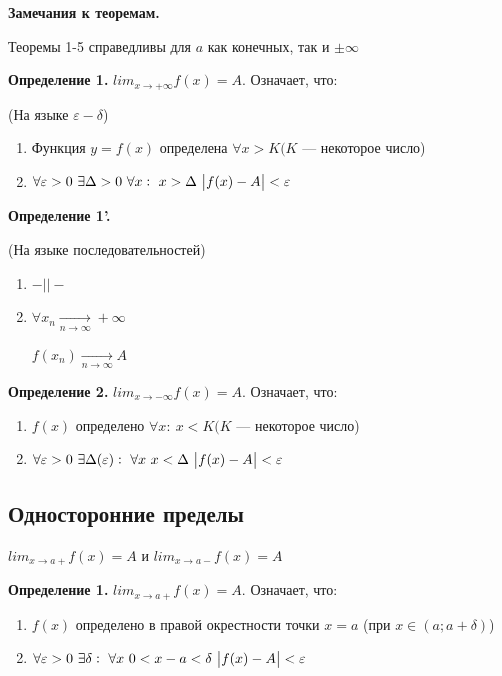 \documentclass{article}
\begin{document}
  \textbf{Замечания к теоремам.}
  
  Теоремы 1-5 справедливы для \(a\) как конечных, так и \(\pm\infty\)

  \textbf{Определение 1.} \(lim_{x \rightarrow +\infty} f(x) = A\). Означает, что:

  (На языке \(\varepsilon - \delta\))

  \begin{enumerate}
    \item Функция \(y = f(x)\) определена \(\forall x > K(K\) --- некоторое число)
    \item \(\forall \varepsilon > 0\ \exists \Delta > 0\ \forall x:\ x > \Delta\ \abs{f(x)-A} < \varepsilon\)
  \end{enumerate}

  \textbf{Определение 1'.} 
  
  (На языке последовательностей)
  
  \begin{enumerate}
    \item \(-||-\)
    \item \( \forall x_n \xrightarrow[n \rightarrow \infty]{} +\infty \)
    
    \(f(x_n) \xrightarrow[n \rightarrow \infty]{} A\)
  \end{enumerate}

  
  \textbf{Определение 2.} \(lim_{x \rightarrow -\infty} f(x) = A\). Означает, что:
  \begin{enumerate}
    \item \(f(x)\) определено \(\forall x:\ x < K(K\) --- некоторое число)
    \item \(\forall \varepsilon > 0\ \exists \Delta(\varepsilon):\ \forall x\ x < \Delta\ \abs{f(x)-A}<\varepsilon\)
  \end{enumerate}

  
  \subsection{Односторонние пределы}

  \( lim_{x \rightarrow a+} f(x) = A \) и \( lim_{x \rightarrow a-} f(x) = A \)

  \textbf{Определение 1.} \( lim_{x \rightarrow a+} f(x) = A \). Означает, что:

  \begin{enumerate}
    \item \(f(x)\) определено в правой окрестности точки \(x = a\) (при \( x \in (a; a + \delta) \))
    \item \(\forall \varepsilon > 0\ \exists \delta:\ \forall x\ 0 < x-a < \delta\ \abs{f(x)-A}<\varepsilon\)
  \end{enumerate}
\end{document}
